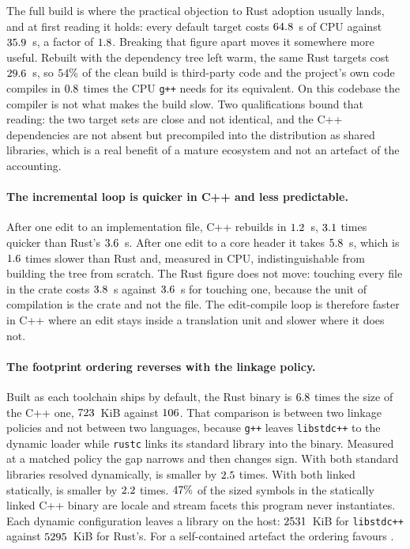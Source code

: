 \documentclass[english,oneside,a4paper,censored,csm,software-track-2020]{HYthesisML}
\begin{document}
\begin{appendices}
The full build is where the practical objection to Rust adoption usually lands, and at first
reading it holds: every default target costs $64.8$~s of CPU against
$35.9$~s, a factor of $1.8$. Breaking that figure apart moves it somewhere
more useful. Rebuilt with the dependency tree left warm, the same Rust targets cost
$29.6$~s, so $54\%$ of the clean build is third-party code and
the project's own code compiles in $0.8$ times the CPU \texttt{g++} needs
for its equivalent. On this codebase the compiler is not what makes the build slow. Two
qualifications bound that reading: the two target sets are close and not identical, and the C++
dependencies are not absent but precompiled into the distribution as shared libraries, which
is a real benefit of a mature ecosystem and not an artefact of the accounting.

\paragraph{The incremental loop is quicker in C++ and less predictable.}
After one edit to an implementation file, C++ rebuilds in $1.2$~s, $3.1$
times quicker than Rust's $3.6$~s. After one edit to a core header it takes
$5.8$~s, which is $1.6$ times slower than Rust and, measured in
CPU, indistinguishable from building the tree from scratch. The Rust figure does not move:
touching every file in the crate costs $3.8$~s against $3.6$~s for
touching one, because the unit of compilation is the crate and not the file. The edit-compile loop
is therefore faster in C++ where an edit stays inside a translation unit and slower where it does
not.

\paragraph{The footprint ordering reverses with the linkage policy.}
Built as each toolchain ships by default, the Rust \texttt{\FootTarget} binary is
$6.8$ times the size of the C++ one, $723$~KiB against
$106$. That comparison is between two linkage policies and not between two languages,
because \texttt{g++} leaves \texttt{libstdc++} to the dynamic loader while \texttt{rustc} links its
standard library into the binary. Measured at a matched policy the gap narrows and then changes
sign. With both standard libraries resolved dynamically, \FootDynamicSmaller{} is smaller by
$2.5$ times. With both linked statically, \FootStaticSmaller{} is smaller by
$2.2$ times. $47\%$ of the sized symbols in the statically linked
C++ binary are locale and stream facets this program never instantiates. Each dynamic configuration
leaves a library on the host: $2531$~KiB for \texttt{libstdc++} against
$5295$~KiB for Rust's. For a self-contained artefact the ordering favours
\FootStaticSmaller{}.


\end{appendices}
\end{document}
